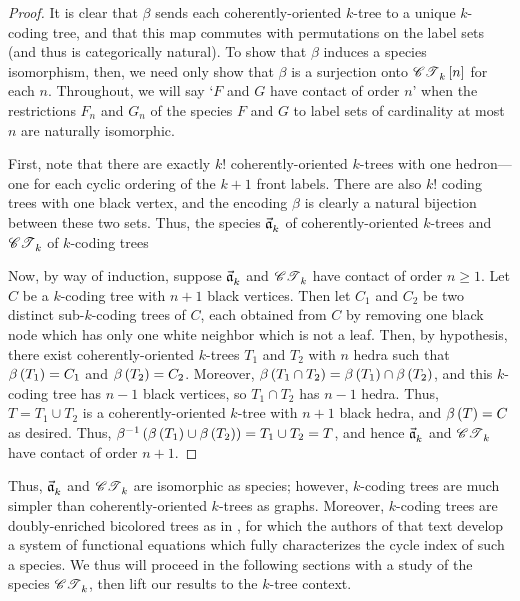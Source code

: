 \documentclass[distribution,draft]{brandiss} %
\numberwithin{section}{chapter}
\numberwithin{figure}{chapter}
\begin{document}
\begin{proof}
  It is clear that $\beta$ sends each coherently-oriented $k$-tree to a unique $k$-coding tree, and that this map commutes with permutations on the label sets (and thus is categorically natural).
  To show that $\beta$ induces a species isomorphism, then, we need only show that $\beta$ is a surjection onto $\mathscr{CT}_{k}^{} \left[ {n} \right]$ for each $n$.
  Throughout, we will say `$F$ and $G$ have contact of order $n$' when the restrictions $F_{n}$ and $G_{n}$ of the species $F$ and $G$ to label sets of cardinality at most $n$ are naturally isomorphic.
  
  First, note that there are exactly $k!$ coherently-oriented $k$-trees with one hedron---one for each cyclic ordering of the $k+1$ front labels.
  There are also $k!$ coding trees with one black vertex, and the encoding $\beta$ is clearly a natural bijection between these two sets.
  Thus, the species $\vec{\mathfrak{a}}_{k}^{}$ of coherently-oriented $k$-trees and $\mathscr{CT}_{k}^{}$ of $k$-coding trees 

  Now, by way of induction, suppose $\vec{\mathfrak{a}}_{k}^{}$ and $\mathscr{CT}_{k}^{}$ have contact of order $n \geq 1$.
  Let $C$ be a $k$-coding tree with $n+1$ black vertices.
  Then let $C_{1}$ and $C_{2}$ be two distinct sub-$k$-coding trees of $C$, each obtained from $C$ by removing one black node which has only one white neighbor which is not a leaf.
  Then, by hypothesis, there exist coherently-oriented $k$-trees $T_{1}$ and $T_{2}$ with $n$ hedra such that $\beta \left( {T_{1}} \right) = C_{1}$ and $\beta \left( {T_{2}} \right) = C_{2}$.
  Moreover, $\beta \left( {T_{1} \cap T_{2}} \right) = \beta \left( {T_{1}} \right) \cap \beta \left( {T_{2}} \right)$, and this $k$-coding tree has $n-1$ black vertices, so $T_{1} \cap T_{2}$ has $n-1$ hedra.
  Thus, $T = T_{1} \cup T_{2}$ is a coherently-oriented $k$-tree with $n+1$ black hedra, and $\beta \left( {T} \right) = C$ as desired.
  Thus, $\beta^{-1} \left( {\beta \left( {T_{1}} \right) \cup \beta \left( {T_{2}} \right)} \right) = T_{1} \cup T_{2} = T$, and hence $\vec{\mathfrak{a}}_{k}^{}$ and $\mathscr{CT}_{k}^{}$ have contact of order $n+1$.
\end{proof}

Thus, $\vec{\mathfrak{a}}_{k}^{}$ and $\mathscr{CT}_{k}^{}$ are isomorphic as species; however, $k$-coding trees are much simpler than coherently-oriented $k$-trees as graphs.
Moreover, $k$-coding trees are doubly-enriched bicolored trees as in \cite[\S 3.2]{bll:species}, for which the authors of that text develop a system of functional equations which fully characterizes the cycle index of such a species.
We thus will proceed in the following sections with a study of the species $\mathscr{CT}_{k}^{}$, then lift our results to the $k$-tree context.
\end{document}
